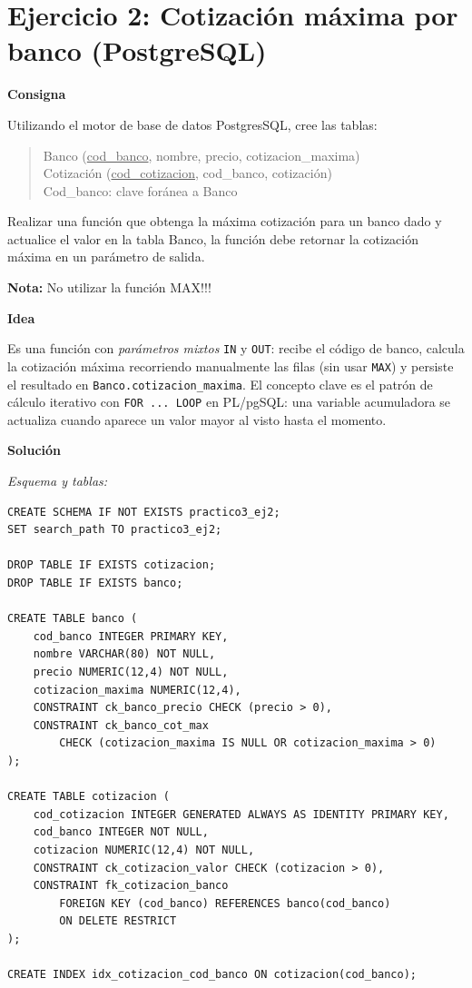 \documentclass[11pt,a4paper]{article}
\newcommand{\itemcabecera}[1]{\noindent\textbf{#1}\par\medskip}
\newcommand{\bloqueConsigna}{\itemcabecera{Consigna}}
\newcommand{\bloqueIdea}{\itemcabecera{Idea}}
\newcommand{\bloqueSolucion}{\itemcabecera{Soluci\'on}}
\begin{document}
\section{Ejercicio 2: Cotización máxima por banco (PostgreSQL)}

\bloqueConsigna

Utilizando el motor de base de datos PostgresSQL, cree las tablas:

\begin{quote}\ttfamily\small
Banco (\underline{cod\_banco}, nombre, precio, cotizacion\_maxima)\\
Cotización (\underline{cod\_cotizacion}, cod\_banco, cotización)\\
\hspace*{1em} Cod\_banco: clave foránea a Banco
\end{quote}

Realizar una función que obtenga la máxima cotización para un banco dado y actualice el valor en la tabla Banco, la función debe retornar la cotización máxima en un parámetro de salida.

\textbf{Nota:} No utilizar la función MAX!!!

\bloqueIdea

Es una función con \emph{parámetros mixtos} \texttt{IN} y \texttt{OUT}: recibe el código de banco, calcula la cotización máxima recorriendo manualmente las filas (sin usar \texttt{MAX}) y persiste el resultado en \texttt{Banco.cotizacion\_maxima}. El concepto clave es el patrón de cálculo iterativo con \texttt{FOR ... LOOP} en PL/pgSQL: una variable acumuladora se actualiza cuando aparece un valor mayor al visto hasta el momento.

\bloqueSolucion

\textit{Esquema y tablas:}

\begin{lstlisting}
CREATE SCHEMA IF NOT EXISTS practico3_ej2;
SET search_path TO practico3_ej2;

DROP TABLE IF EXISTS cotizacion;
DROP TABLE IF EXISTS banco;

CREATE TABLE banco (
    cod_banco INTEGER PRIMARY KEY,
    nombre VARCHAR(80) NOT NULL,
    precio NUMERIC(12,4) NOT NULL,
    cotizacion_maxima NUMERIC(12,4),
    CONSTRAINT ck_banco_precio CHECK (precio > 0),
    CONSTRAINT ck_banco_cot_max
        CHECK (cotizacion_maxima IS NULL OR cotizacion_maxima > 0)
);

CREATE TABLE cotizacion (
    cod_cotizacion INTEGER GENERATED ALWAYS AS IDENTITY PRIMARY KEY,
    cod_banco INTEGER NOT NULL,
    cotizacion NUMERIC(12,4) NOT NULL,
    CONSTRAINT ck_cotizacion_valor CHECK (cotizacion > 0),
    CONSTRAINT fk_cotizacion_banco
        FOREIGN KEY (cod_banco) REFERENCES banco(cod_banco)
        ON DELETE RESTRICT
);

CREATE INDEX idx_cotizacion_cod_banco ON cotizacion(cod_banco);
\end{lstlisting}
\end{document}
